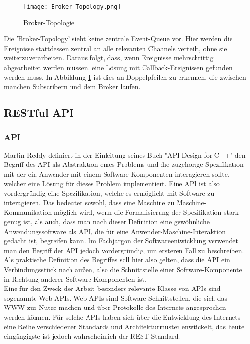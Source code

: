 \begin{figure}
  \centering
  \texttt{[image: Broker Topology.png]}
  \caption[Broker-Topologie]{Broker-Topologie \cite[][]{wickramarachchi_2017_event}}
  \label{brokertop}
\end{figure}
Die 'Broker-Topology' sieht keine zentrale Event-Queue vor. Hier werden die Ereignisse stattdessen zentral an alle relevanten Channels verteilt, ohne sie weiterzuverarbeiten. Daraus folgt, dass, wenn Ereignisse mehrschrittig abgearbeitet werden müssen, eine Lösung mit Callback-Ereignissen gefunden werden muss. In Abbildung \ref{brokertop} ist dies an Doppelpfeilen zu erkennen, die zwischen manchen Subscribern und dem Broker laufen. \cite[Vgl. ][]{wickramarachchi_2017_event}
\subsection{RESTful API}
\subsubsection*{API}
Martin Reddy definiert in der Einleitung seines Buch "API Design for C++" den Begriff des \ac{API} als Abstraktion eines Problems und die zugehörige Spezifikation mit der ein Anwender mit einem Software-Komponenten interagieren sollte, welcher eine Lösung für dieses Problem implementiert. \cite[Vgl. ][S. 1]{reddy2011api} Eine API ist also vordergründig eine Spezifikation, welche es ermöglicht mit Software zu interagieren. Das bedeutet sowohl, dass eine Maschine zu Maschine-Kommunikation möglich wird, wenn die Formalisierung der Spezifikation stark genug ist, als auch, dass man nach dieser Definition eine gewöhnliche Anwendungssoftware als API, die für eine Anwender-Maschine-Interaktion gedacht ist, begreifen kann. Im Fachjargon der Softwareentwicklung verwendet man den Begriff der \ac{API} jedoch vordergründig, um ersteren Fall zu beschreiben. Als praktische Definition des Begriffes soll hier also gelten, dass die API ein Verbindungsstück nach außen, also die Schnittstelle einer Software-Komponente in Richtung anderer Software-Komponenten ist. \\
Eine für den Zweck der Arbeit besonders relevante Klasse von \ac{API}s sind sogenannte Web-\ac{API}s. Web-\ac{API}s sind Software-Schnittstellen, die sich das \ac{WWW} zur Nutze machen und über Protokolle des Internets angesprochen werden können. Für solche \ac{API}s haben sich über die Entwicklung des Internets eine Reihe verschiedener Standards und Architekturmuster enwtickelt, das heute eingängigste ist jedoch wahrscheinlich der REST-Standard. \cite[Vgl. ][S.5f]{richardson2007web}
